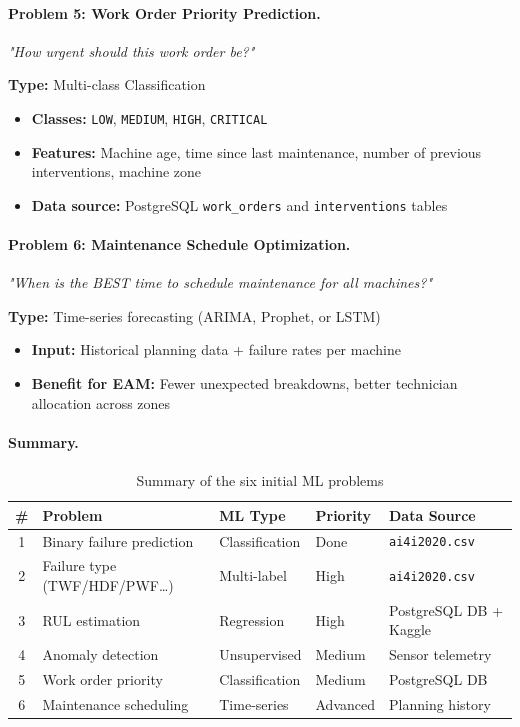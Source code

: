 \paragraph{Problem 5: Work Order Priority Prediction.}
\emph{"How urgent should this work order be?"}

\textbf{Type:} Multi-class Classification

\begin{itemize}
\item \textbf{Classes:} \texttt{LOW}, \texttt{MEDIUM}, \texttt{HIGH}, \texttt{CRITICAL}
\item \textbf{Features:} Machine age, time since last maintenance, number of previous interventions, machine zone
\item \textbf{Data source:} PostgreSQL \texttt{work\_orders} and \texttt{interventions} tables
\end{itemize}

\paragraph{Problem 6: Maintenance Schedule Optimization.}
\emph{"When is the BEST time to schedule maintenance for all machines?"}

\textbf{Type:} Time-series forecasting (ARIMA, Prophet, or LSTM)

\begin{itemize}
\item \textbf{Input:} Historical planning data + failure rates per machine
\item \textbf{Benefit for EAM:} Fewer unexpected breakdowns, better technician allocation across zones
\end{itemize}

\paragraph{Summary.}

\begin{table}[h]
\centering
\begin{tabularx}{\textwidth}{|c|X|X|X|X|}
\toprule
\textbf{\#} & \textbf{Problem} & \textbf{ML Type} & \textbf{Priority} & \textbf{Data Source} \\
\midrule
1 & Binary failure prediction & Classification & Done & \texttt{ai4i2020.csv} \\
\midrule
2 & Failure type (TWF/HDF/PWF\ldots) & Multi-label & High & \texttt{ai4i2020.csv} \\
\midrule
3 & RUL estimation & Regression & High & PostgreSQL DB + Kaggle \\
\midrule
4 & Anomaly detection & Unsupervised & Medium & Sensor telemetry \\
\midrule
5 & Work order priority & Classification & Medium & PostgreSQL DB \\
\midrule
6 & Maintenance scheduling & Time-series & Advanced & Planning history \\
\bottomrule
\end{tabularx}
\caption{Summary of the six initial ML problems}
\label{tab:six-problems-summary}
\end{table}

